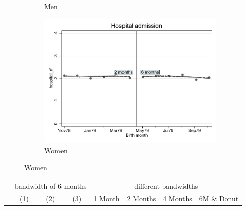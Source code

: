 \documentclass[a4paper ]{article}
\begin{document}
\begin{figure}[h]
\begin{subfigure}[t]{0.31\textwidth}
		\caption{Men}		
	\end{subfigure}
	\quad
	\begin{subfigure}[t]{0.31\textwidth}
		\centering
		\includegraphics[width=0.99\textwidth]{R1_RD_hospital_rf_fits}
		\caption{Women}
	\end{subfigure}
\end{figure}


\begin{table}[h]\centering
\def\sym#1{\ifmmode^{#1}\else\(^{#1}\)\fi}
\begin{tabular}{l*{3}{c}|cccc}
\toprule
&\multicolumn{3}{c}{bandwidth of 6 months} & \multicolumn{4}{c}{different bandwidths} \\
 \cmidrule(lr{1em}){2-4} \cmidrule(lr{1em}){5-8}
 &\multicolumn{1}{c}{(1)}&\multicolumn{1}{c}{(2)}&\multicolumn{1}{c}{(3)}& 1 Month & 2 Months & 4 Months & 6M \& Donut \\
\midrule 

\bottomrule
\end{tabular}
\end{table}
\end{document}
